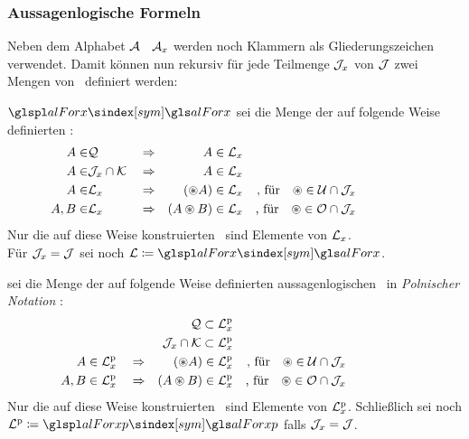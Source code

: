 \subsubsection{Aussagenlogische Formeln}%
\label{subsub:Formeln}
\hidden{\Formel}

Neben dem Alphabet $\mathcal{A}$ \textbzw\ $\mathcal{A}_x$ werden noch Klammern als Gliederungszeichen verwendet.
Damit können nun rekursiv für jede Teilmenge $\mathcal{J}_x$ von $\mathcal{J}$ zwei Mengen von \Formeln\ definiert werden:

$\glsSym{alForx}$ sei die Menge der auf folgende Weise definierten %
:
\begin{align}
	A    \in & \mathcal{Q}               && \Rightarrow &           A  \in \mathcal{L}_x
	\\
	A    \in & \mathcal{J}_x \cap \mathcal{K}  && \Rightarrow &           A  \in \mathcal{L}_x
	\\
	A    \in & \mathcal{L}_x              && \Rightarrow &   (\circledast A) \in \mathcal{L}_x
	& & \text{, für} \quad \circledast \in \mathcal{U} \cap \mathcal{J}_x
	\\
	A, B \in & \mathcal{L}_x              && \Rightarrow & (A \circledast B) \in \mathcal{L}_x
	& & \text{, für} \quad \circledast \in \mathcal{O} \cap \mathcal{J}_x
	&&&&&&&&&&
\end{align}
Nur die auf diese Weise konstruierten \Formeln\ sind Elemente von $\mathcal{L}_x$.
\\Für $\mathcal{J}_x = \mathcal{J}$ sei noch $\alFor \defeq \glsSym{alForx}$.

 sei die Menge der auf folgende Weise definierten aussagenlogischen \Formeln\ in \emph{Polnischer Notation}%
:
\begin{align}
	&                                  & \mathcal{Q}              \subset \mathcal{L}^\mathrm{p}_x
	\\
	&                                  & \mathcal{J}_x \cap \mathcal{K} \subset \mathcal{L}^\mathrm{p}_x
	\\
	A    \in \mathcal{L}^\mathrm{p}_x & \quad \Rightarrow &  (\circledast A)         \in     \mathcal{L}^\mathrm{p}_x
	& & \text{, für}  \quad \circledast \in \mathcal{U} \cap \mathcal{J}_x
	\\
	A, B \in \mathcal{L}^\mathrm{p}_x & \quad \Rightarrow & (A \circledast B)        \in     \mathcal{L}^\mathrm{p}_x
	& & \text{, für}  \quad \circledast \in \mathcal{O} \cap \mathcal{J}_x
	&&&&&&&&&&
\end{align}
Nur die auf diese Weise konstruierten \Formeln\ sind Elemente von $\mathcal{L}^\mathrm{p}_x$.
Schließlich sei noch $\alForp \defeq \glsSym{alForxp}$ falls $\mathcal{J}_x = \mathcal{J}$.

